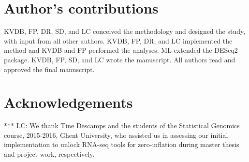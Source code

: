 \documentclass{bmcart}
\newcommand{\RPack}[1]{\textsf{#1}}
\newcommand{\lc}[1]{\textcolor{ao}{*** LC: #1}}
\begin{document}
\begin{backmatter}
\section*{Author's contributions} 
KVDB, FP, DR, SD, and LC conceived the methodology and designed the study, with input from all other authors. KVDB, FP, DR, and LC implemented the method and KVDB and FP performed the analyses. ML extended the \RPack{DESeq2} package. KVDB, FP, SD, and LC wrote the manuscript. All authors read and approved the final manuscript.

\section*{Acknowledgements}
\lc{We thank Tine Descamps and the students of the Statistical Genomics course, 2015-2016, Ghent University, who assisted us in assessing our initial implementation to unlock RNA-seq tools for zero-inflation during master thesis and project work, respectively.}







\end{backmatter}
\end{document}

